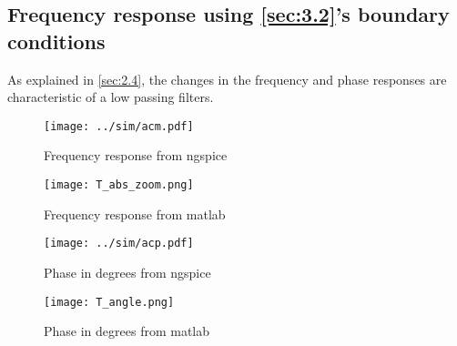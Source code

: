 \subsection{Frequency response using \ref{sec:3.2}'s boundary conditions }
As explained in \ref{sec:2.4}, the changes in the frequency and phase responses are characteristic of a low passing filters.

\begin{figure}[!htb]
      \texttt{[image: ../sim/acm.pdf]}
      \caption{Frequency response from ngspice}
      \label{fig:trans5}
    \endminipage\hfill
      \texttt{[image: T\_abs\_zoom.png]} %
      \caption{Frequency response from matlab}
    \endminipage\hfill
\end{figure}



\vspace{2.0cm}


\begin{figure}[h]
      \texttt{[image: ../sim/acp.pdf]}
      \caption{Phase in degrees from ngspice}
      \label{fig:trans6}
    \endminipage\hfill
      \texttt{[image: T\_angle.png]} %
      \caption{Phase in degrees from matlab}
    \endminipage\hfill
\end{figure}
